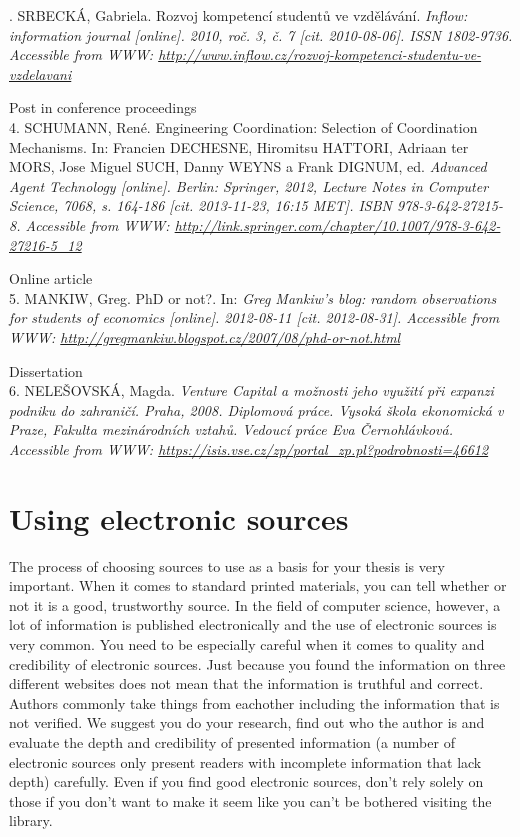 {{. SRBECKÁ, Gabriela. Rozvoj kompetencí studentů ve vzdělávání. \it Inflow: information journal \rm [online]. 2010, roč. 3, č. 7 [cit. 2010-08-06]. ISSN 1802-9736. Accessible from WWW: \url{http://www.inflow.cz/rozvoj-kompetenci-studentu-ve-vzdelavani}

\bigskip
\noindent Post in conference proceedings \\
4. SCHUMANN, René. Engineering Coordination: Selection of Coordination Mechanisms. In: Francien DECHESNE, Hiromitsu HATTORI, Adriaan ter MORS, Jose Miguel SUCH, Danny WEYNS a Frank DIGNUM, ed. \it Advanced Agent Technology \rm [online]. Berlin: Springer, 2012, Lecture Notes in Computer Science, 7068, s. 164-186 [cit. 2013-11-23, 16:15 MET]. ISBN 978-3-642-27215-8. Accessible from WWW: \url{http://link.springer.com/chapter/10.1007/978-3-642-27216-5\_12}

\bigskip
\noindent Online article \\
5. MANKIW, Greg. PhD or not?. In: \it Greg Mankiw's blog: random observations for students of economics \rm [online]. 2012-08-11 [cit. 2012-08-31]. Accessible from WWW: \url{http://gregmankiw.blogspot.cz/2007/08/phd-or-not.html}

\bigskip
\noindent Dissertation \\
6. NELEŠOVSKÁ, Magda. \it Venture Capital a možnosti jeho využití při expanzi podniku do zahraničí\rm . Praha, 2008. Diplomová práce. Vysoká škola ekonomická v Praze, Fakulta mezinárodních vztahů. Vedoucí práce Eva Černohlávková. Accessible from WWW: \url{https://isis.vse.cz/zp/portal\_zp.pl?podrobnosti=46612}

\section{Using electronic sources}

The process of choosing sources to use as a basis for your thesis is very important. When it comes to standard printed materials, you can tell whether or not it is a good, trustworthy source. In the field of computer science, however, a lot of information is published electronically and the use of electronic sources is very common. You need to be especially careful when it comes to quality and credibility of electronic sources. Just because you found the information on three different websites does not mean that the information is truthful and correct. Authors commonly take things from eachother including the information that is not verified. We suggest you do your research, find out who the author is and evaluate the depth and credibility of presented information (a number of electronic sources only present readers with incomplete information that lack depth) carefully. Even if you find good electronic sources, don't rely solely on those if you don't want to make it seem like you can't be bothered visiting the library.

}}
